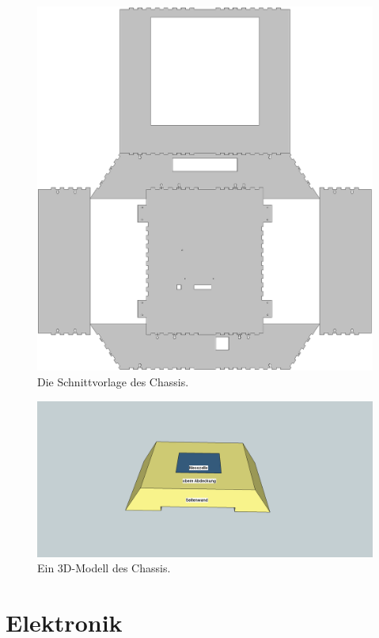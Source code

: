 \documentclass[a4paper,bibtotoc,oneside]{scrbook}
\begin{document}
\begin{figure}[htbp]
\centering
\includegraphics[width=125mm]{img/gehause3.png}
\caption[Chassis]{Die Schnittvorlage des Chassis.}\label{gehause}
\end{figure}

\begin{figure}[htbp]
\centering
\includegraphics[width=125mm]{img/robo3d.png}
\caption[Chassis]{Ein 3D-Modell des Chassis.}\label{robo3d}
\end{figure}


\section{Elektronik}\thispagestyle{empty}
\end{document}
